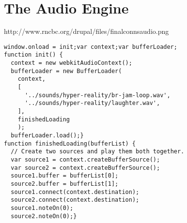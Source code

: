 \documentclass[letterpaper, 12pt]{article}
\begin{document}
\section{The Audio Engine}
%
%
% 
http://www.rncbc.org/drupal/files/finalconnsaudio.png
\begin{Verbatim}[fontfamily=courier, xleftmargin=\parindent]
window.onload = init;var context;var bufferLoader;
function init() {
  context = new webkitAudioContext();
  bufferLoader = new BufferLoader(
    context,
    [
      '../sounds/hyper-reality/br-jam-loop.wav',
      '../sounds/hyper-reality/laughter.wav',
    ],
    finishedLoading
    );
  bufferLoader.load();}
function finishedLoading(bufferList) {
  // Create two sources and play them both together.
  var source1 = context.createBufferSource();
  var source2 = context.createBufferSource();
  source1.buffer = bufferList[0];
  source2.buffer = bufferList[1];
  source1.connect(context.destination);
  source2.connect(context.destination);
  source1.noteOn(0);
  source2.noteOn(0);}
\end{Verbatim}
\end{document}
